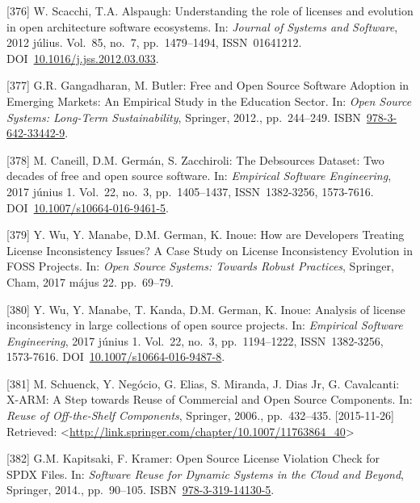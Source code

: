 \documentclass[12pt,magyar,a4paper,oneside]{scrreprt}
\begin{document}
\leavevmode\hypertarget{ref-scacchi_understanding_2012}{}%
{[}376{]} W. Scacchi, T.A. Alspaugh: Understanding the role of licenses
and evolution in open architecture software ecosystems. In:
\emph{Journal of Systems and Software}, 2012 július. Vol.~85, no.~7,
pp.~1479--1494, ISSN~01641212.
DOI~\href{https://doi.org/10.1016/j.jss.2012.03.033}{10.1016/j.jss.2012.03.033}.

\leavevmode\hypertarget{ref-gangadharan_free_2012}{}%
{[}377{]} G.R. Gangadharan, M. Butler: Free and Open Source Software
Adoption in Emerging Markets: An Empirical Study in the Education
Sector. In: \emph{Open Source Systems: Long-Term Sustainability},
Springer, 2012., pp.~244--249.
ISBN~\href{https://worldcat.org/isbn/978-3-642-33442-9}{978-3-642-33442-9}.

\leavevmode\hypertarget{ref-caneill_debsources_2017}{}%
{[}378{]} M. Caneill, D.M. Germán, S. Zacchiroli: The Debsources
Dataset: Two decades of free and open source software. In:
\emph{Empirical Software Engineering}, 2017 június 1. Vol.~22, no.~3,
pp.~1405--1437, ISSN~1382-3256, 1573-7616.
DOI~\href{https://doi.org/10.1007/s10664-016-9461-5}{10.1007/s10664-016-9461-5}.

\leavevmode\hypertarget{ref-wu_how_2017}{}%
{[}379{]} Y. Wu, Y. Manabe, D.M. German, K. Inoue: How are Developers
Treating License Inconsistency Issues? A Case Study on License
Inconsistency Evolution in FOSS Projects. In: \emph{Open Source Systems:
Towards Robust Practices}, Springer, Cham, 2017 május 22. pp.~69--79.

\leavevmode\hypertarget{ref-wu_analysis_2017}{}%
{[}380{]} Y. Wu, Y. Manabe, T. Kanda, D.M. German, K. Inoue: Analysis of
license inconsistency in large collections of open source projects. In:
\emph{Empirical Software Engineering}, 2017 június 1. Vol.~22, no.~3,
pp.~1194--1222, ISSN~1382-3256, 1573-7616.
DOI~\href{https://doi.org/10.1007/s10664-016-9487-8}{10.1007/s10664-016-9487-8}.

\leavevmode\hypertarget{ref-schuenck_x-arm_2006}{}%
{[}381{]} M. Schuenck, Y. Negócio, G. Elias, S. Miranda, J. Dias Jr, G.
Cavalcanti: X-ARM: A Step towards Reuse of Commercial and Open Source
Components. In: \emph{Reuse of Off-the-Shelf Components}, Springer,
2006., pp.~432--435. {[}2015-11-26{]} Retrieved:
\textless{}\url{http://link.springer.com/chapter/10.1007/11763864_40}\textgreater{}

\leavevmode\hypertarget{ref-kapitsaki_open_2014}{}%
{[}382{]} G.M. Kapitsaki, F. Kramer: Open Source License Violation Check
for SPDX Files. In: \emph{Software Reuse for Dynamic Systems in the
Cloud and Beyond}, Springer, 2014., pp.~90--105.
ISBN~\href{https://worldcat.org/isbn/978-3-319-14130-5}{978-3-319-14130-5}.
\end{document}
